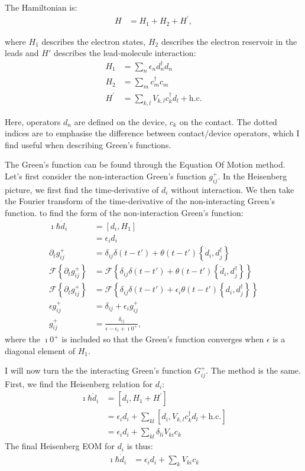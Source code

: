 The Hamiltonian is:
\begin{align}
H &= H_1 + H_2 + H^\prime, \label{eq:hamiltonian}
\end{align}

where $H_1$ describes the electron states, $H_2$ describes the electron reservoir in the leads and $H'$ describes the lead-molecule interaction:
\begin{align*}
H_1 &= \sum_n \epsilon_n d^\dagger_n d_n \\
H_2 &= \sum_{m} c^\dagger_{m} c_{m} \\
H^\prime &= \sum_{k, l} V_{k, l} c^\dagger_{k} d_l + \text{h.c.}
\end{align*}

Here, operators $d_n$ are defined on the device, $c_{k}$ on the contact. The dotted indices are to emphasise the difference between contact/device operators, which I find useful when describing Green's functions. 

The Green's function can be found through the Equation Of Motion method. Let's first consider the non-interaction Green's function $g_{ij}^+$. In the Heisenberg picture, we first find the time-derivative of $d_i$ without interaction. We then take the Fourier transform of the time-derivative of the non-interacting Green's function. to find the form of the non-interaction Green's function:
\begin{align*}
\imath \hbar \dot{d}_i &= \left[d_i, H_1\right] \\
&= \epsilon_i d_i \\
\partial_t g_{ij}^+ &= \delta_{ij} \delta(t-t') + \theta(t-t')\left\{ \dot{d}_i, d_j^\dagger\right\} \\
\mathscr{F}\left\{\partial_t g_{ij}^+ \right\}&= \mathscr{F}\left\{\delta_{ij} \delta(t-t') + \theta(t-t')\left\{ \dot{d}_i, d_j^\dagger\right\}\right\} \\
\mathscr{F}\left\{\partial_t g_{ij}^+ \right\}&= \mathscr{F}\left\{\delta_{ij} \delta(t-t') +\epsilon_i \theta(t-t')\left\{ d_i, d_j^\dagger\right\}\right\} \\ 
\epsilon g_{ij}^+ &= \delta_{ij} + \epsilon_i g_{ij}^+ \\
g_{ij}^+ &= \frac{ \delta_{ij} }{ \epsilon - \epsilon_i + \imath 0^+},
\end{align*}
where the $\imath 0^+$ is included so that the Green's function converges when $\epsilon$ is a diagonal element of $H_1$.

I will now turn the the interacting Green's function $G_{ij}^+$. The method is the same.
First, we find the Heisenberg relation for $d_i$:
\begin{align*}
\imath \hbar \dot{d}_i &= \left[ d_i, H_1 + H^\prime\right] \\
&=\epsilon_i d_i + \sum_{kl}\left[d_i, V_{k, l} c^\dagger_{k} d_l + \text{h.c.}\right] \\
&=\epsilon_i d_i + \sum_{kl}\delta_{li} V_{ki} c_{k}
\end{align*}
The final Heisenberg EOM for $d_i$ is thus:
\begin{align}
\imath \hbar \dot{d}_i &= \epsilon_i d_i + \sum_{k}V_{ki} c_{k} \label{eq:heisenbergdotd}
\end{align}

